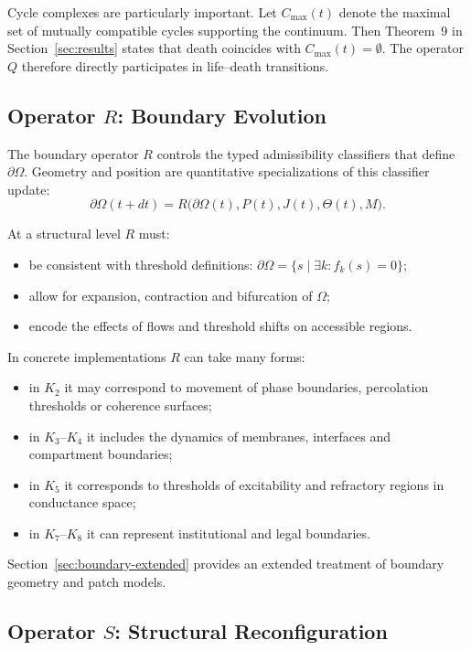 Cycle complexes are particularly important. Let \(C_{\max}(t)\) denote the
maximal set of mutually compatible cycles supporting the continuum. Then
Theorem~9 in Section~\ref{sec:results} states that death coincides with
\(C_{\max}(t) = \emptyset\). The operator \(Q\) therefore directly participates
in life–death transitions.

\subsection{Operator \texorpdfstring{\texorpdfstring{$R$}{R}}{R}: Boundary Evolution}

The boundary operator \(R\) controls the typed admissibility classifiers that
define \(\partial\Omega\). Geometry and position are quantitative
specializations of this classifier update:
\[
  \partial\Omega(t+dt) =
    R\big(\partial\Omega(t), P(t), J(t), \Theta(t), M\big).
\]

At a structural level \(R\) must:
\begin{itemize}
  \item be consistent with threshold definitions:
        \(\partial\Omega = \{ s \mid \exists k: f_k(s) = 0 \}\);
  \item allow for expansion, contraction and bifurcation of \(\Omega\);
  \item encode the effects of flows and threshold shifts on accessible regions.
\end{itemize}

In concrete implementations \(R\) can take many forms:
\begin{itemize}
  \item in \(K_2\) it may correspond to movement of phase boundaries,
        percolation thresholds or coherence surfaces;
  \item in \(K_3\)–\(K_4\) it includes the dynamics of membranes, interfaces
        and compartment boundaries;
  \item in \(K_5\) it corresponds to thresholds of excitability and refractory
        regions in conductance space;
  \item in \(K_7\)–\(K_8\) it can represent institutional and legal
        boundaries.
\end{itemize}

Section~\ref{sec:boundary-extended} provides an extended treatment of boundary
geometry and patch models.

\subsection{Operator \texorpdfstring{\texorpdfstring{$S$}{S}}{S}: Structural Reconfiguration}

